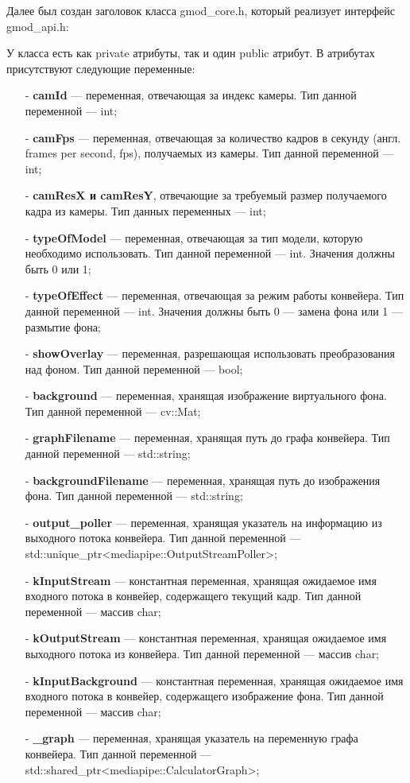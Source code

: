 \documentclass[a4paper,14pt]{extreport}
\begin{document}
        Далее был создан заголовок класса gmod\_core.h, который реализует интерфейс gmod\_api.h:
        
        У класса есть как private атрибуты, так и один public атрибут. В атрибутах присутствуют следующие переменные:
        \begin{itemize}
          \item[-] \textbf{camId} — переменная, отвечающая за индекс камеры. Тип данной переменной — int;
          \item[-] \textbf{camFps} — переменная, отвечающая за количество кадров в секунду (англ. frames per second, fps), получаемых из камеры. Тип данной переменной — int;
          \item[-] \textbf{camResX и camResY}, отвечающие за требуемый размер получаемого кадра из камеры. Тип данных переменных — int;
          \item[-] \textbf{typeOfModel} — переменная, отвечающая за тип модели, которую необходимо использовать. Тип данной переменной — int. Значения должны быть 0 или 1;
          \item[-] \textbf{typeOfEffect} — переменная, отвечающая за режим работы конвейера. Тип данной переменной — int. Значения должны быть 0 — замена фона или 1 — размытие фона;
          \item[-] \textbf{showOverlay} — переменная, разрешающая использовать преобразования над фоном. Тип данной переменной — bool;
          \item[-] \hypertarget{back}{}\textbf{background} — переменная,  хранящая изображение виртуального фона. Тип данной переменной — cv::Mat;
          \item[-] \textbf{graphFilename} — переменная, хранящая путь до графа конвейера. Тип данной переменной — std::string;
          \item[-] \textbf{backgroundFilename} — переменная, хранящая путь до изображения фона. Тип данной переменной — std::string;
          \item[-] \hypertarget{poller}{}\textbf{output\_poller} — переменная, хранящая указатель на информацию из выходного потока конвейера. Тип данной переменной — std::unique\_ptr<mediapipe::OutputStreamPoller>;
          \item[-] \textbf{kInputStream} — константная переменная, хранящая ожидаемое имя входного потока в конвейер, содержащего текущий кадр. Тип данной переменной — массив char;
          \item[-] \textbf{kOutputStream} — константная переменная, хранящая ожидаемое имя выходного потока из конвейера. Тип данной переменной — массив char;
          \item[-] \textbf{kInputBackground} — константная переменная, хранящая ожидаемое имя входного потока в конвейер, содержащего изображение фона. Тип данной переменной — массив char;
          \item[-] \hypertarget{graph}{}\textbf{\_graph} — переменная, хранящая указатель на переменную графа конвейера. Тип данной переменной — std::shared\_ptr<mediapipe::CalculatorGraph>;
        \end{itemize}
\end{document}

